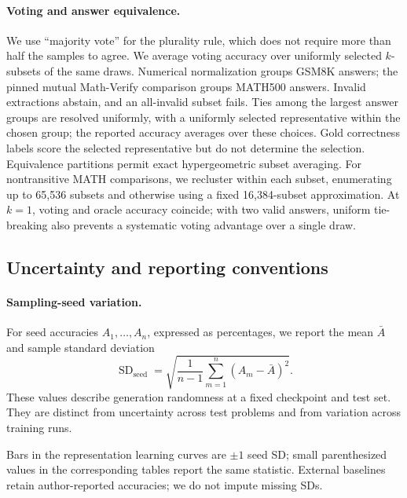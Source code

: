 \documentclass{article}
\begin{document}
\paragraph{Voting and answer equivalence.}
We use ``majority vote'' for the plurality rule, which does not require more than half the samples to agree. We average voting accuracy over uniformly selected $k$-subsets of the same draws. Numerical normalization groups GSM8K answers; the pinned mutual Math-Verify comparison groups MATH500 answers. Invalid extractions abstain, and an all-invalid subset fails. Ties among the largest answer groups are resolved uniformly, with a uniformly selected representative within the chosen group; the reported accuracy averages over these choices. Gold correctness labels score the selected representative but do not determine the selection. Equivalence partitions permit exact hypergeometric subset averaging. For nontransitive MATH comparisons, we recluster within each subset, enumerating up to 65,536 subsets and otherwise using a fixed 16,384-subset approximation. At $k=1$, voting and oracle accuracy coincide; with two valid answers, uniform tie-breaking also prevents a systematic voting advantage over a single draw.

\subsection{Uncertainty and reporting conventions}
\label{app:uncertainty}

\paragraph{Sampling-seed variation.}
For seed accuracies $A_1,\ldots,A_n$, expressed as percentages, we report the mean $\bar A$ and sample standard deviation
\[
  \operatorname{SD}_{\mathrm{seed}}=\sqrt{\frac{1}{n-1}\sum_{m=1}^{n}(A_m-\bar A)^2}.
\]
These values describe generation randomness at a fixed checkpoint and test set. They are distinct from uncertainty across test problems and from variation across training runs.

Bars in the representation learning curves are $\pm1$ seed SD; small parenthesized values in the corresponding tables report the same statistic. External baselines retain author-reported accuracies; we do not impute missing SDs.
\end{document}
